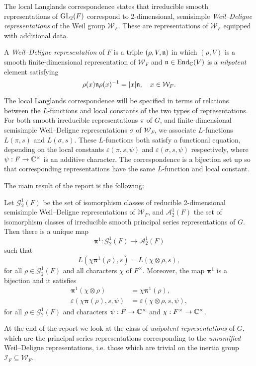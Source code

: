 The local Langlands correspondence states that irreducible smooth representations of $\mathrm{GL}_2(F)$ correspond to 2-dimensional, semisimple \emph{Weil--Deligne representations} of the Weil group $\mathcal{W}_F$. These are representations of $\mathcal{W}_F$ equipped with additional data.
\begin{defn}
	A \emph{Weil--Deligne representation} of $F$ is a triple $(\rho,V,\mathfrak{n})$ in which $(\rho,V)$ is a smooth finite-dimensional representation of $\mathcal{W}_F$ and $\mathfrak{n}\in\mathrm{End}_{\mathbb{C}}(V)$ is a \textit{nilpotent} element satisfying
	$$\rho(x)\mathfrak{n}\rho(x)^{-1}=|x|\mathfrak{n},\quad x\in \mathcal{W}_F.$$
\end{defn}

The local Langlands correspondence will be specified in terms of relations between the $L$-functions and local constants of the two types of representations. For both smooth irreducible representations $\pi$ of $G$, and finite-dimensional semisimple Weil--Deligne representations $\sigma$ of $\mathcal{W}_F$, we associate $L$-functions $L(\pi, s)$ and $L(\sigma, s)$. These $L$-functions both satisfy a functional equation, depending on the local constants $\varepsilon(\pi, s, \psi)$ and $\varepsilon(\sigma, s, \psi)$ respectively, where $\psi: F\to \mathbb{C}^\times$ is an additive character. The correspondence is a bijection set up so that corresponding representations have the same $L$-function and local constant.

The main result of the report is the following:
\begin{thm}[ = Theorem \ref{thm:langcorr2}, Langlands correspondence for principal series representations]
    Let $\mathcal{G}_2^1(F)$ be the set of isomorphism classes of reducible 2-dimensional semisimple Weil--Deligne representations of $\mathcal{W}_F$, and $\mathcal{A}_2^1(F)$ the set of isomorphism classes of irreducible smooth principal series representations of $G$. Then there is a unique map
$$\bm\pi^1:\mathcal{G}_2^1(F)\longrightarrow\mathcal{A}_2^1(F)$$
such that 
\begin{equation*}
	L(\chi\bm\pi^1(\rho),s)=L(\chi\otimes\rho,s),
\end{equation*}
for all $\rho\in\mathcal{G}_2^1(F)$ and all characters $\chi$ of $F^\times$. Moreover, the map $\bm\pi^1$ is a bijection and it satisfies
\begin{equation*}
	\begin{split}
		\bm\pi^1(\chi\otimes\rho)&=\chi\bm\pi^1(\rho),\\
		\varepsilon(\chi\bm\pi(\rho),s,\psi)&=\varepsilon(\chi\otimes\rho,s,\psi),
	\end{split}
\end{equation*}
for all $\rho\in\mathcal{G}_2^1(F)$ and characters $\psi:F \to \mathbb{C}^\times$ and $\chi: F^\times \to \mathbb{C}^\times$.
\end{thm}
At the end of the report we look at the class of \emph{unipotent representations} of $G$, which are the principal series representations corresponding to the \emph{unramified} Weil--Deligne representations, i.e. those which are trivial on the inertia group $\mathcal{I}_F\subseteq \mathcal{W}_F$.

